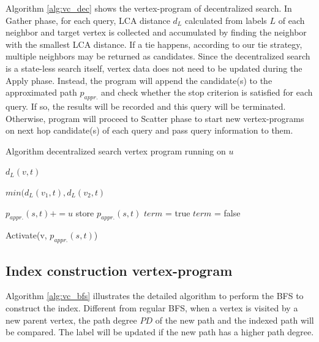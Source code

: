 Algorithm \ref{alg:vc_dec} shows the vertex-program of decentralized search. In Gather phase, for each query, LCA distance $d_L$ calculated from labels $L$ of each neighbor and target vertex is collected and accumulated by finding the neighbor with the smallest LCA distance. If a tie happens, according to our tie strategy, multiple neighbors may be returned as candidates. Since the decentralized search is a state-less search itself, vertex data does not need to be updated during the Apply phase. Instead, the program will append the candidate(s) to the approximated path $p_{appr.}$ and check whether the stop criterion is satisfied for each query. If so, the results will be recorded and this query will be terminated. Otherwise, program will proceed to Scatter phase to start new vertex-programs on next hop candidate(s) of each query and pass query information to them.

\begin{algorithm}
    \caption{Algorithm decentralized search vertex program running on $u$}
		\label{alg:vc_dec}
    \begin{algorithmic}
        \State \Return $d_L(v, t)$
        \EndFunction

        \State \Return $min(d_L(v_1,t), d_L(v_2,t)$
        \EndFunction

        \State $p_{appr.}(s,t) += u$
            \State store $p_{appr.}(s,t)$
            \State $term$ = true
        \Else
            \State $term$ = false
        \EndIf
        \EndFunction

            \State Activate(v, $p_{appr.}(s,t)$)
        \EndIf
        \EndFunction
    \end{algorithmic}
\end{algorithm}

\subsection{Index construction vertex-program}
Algorithm \ref{alg:vc_bfs} illustrates the detailed algorithm to perform the BFS to construct the index. Different from regular BFS, when a vertex is visited by a new parent vertex, the path degree $PD$ of the new path and the indexed path will be compared. The label will be updated if the new path has a higher path degree.

